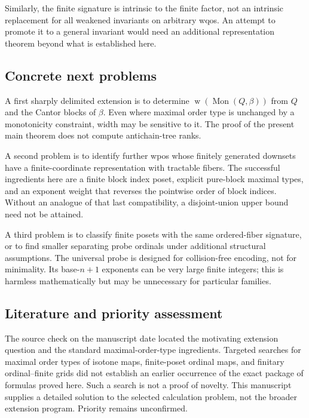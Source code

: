 \documentclass[11pt,a4paper]{article}
\theoremstyle{definition}
\theoremstyle{remark}
\newcommand{\Mon}{\operatorname{Mon}}
\newcommand{\width}{\operatorname{w}}
\begin{document}
Similarly, the finite signature is intrinsic to the finite factor, not an
intrinsic replacement for all weakened invariants on arbitrary wqos. An
attempt to promote it to a general invariant would need an additional
representation theorem beyond what is established here.

\subsection{Concrete next problems}
A first sharply delimited extension is to determine
$\width(\Mon(Q,\beta))$ from $Q$ and the Cantor blocks of $\beta$.
Even where maximal order type is unchanged by a monotonicity constraint,
width may be sensitive to it. The proof of the present main theorem does
not compute antichain-tree ranks.

A second problem is to identify further wpos whose finitely generated
downsets have a finite-coordinate representation with tractable fibers.
The successful ingredients here are a finite block index poset, explicit
pure-block maximal types, and an exponent weight that reverses the
pointwise order of block indices. Without an analogue of that last
compatibility, a disjoint-union upper bound need not be attained.

A third problem is to classify finite posets with the same ordered-fiber
signature, or to find smaller separating probe ordinals under additional
structural assumptions. The universal probe is designed for collision-free
encoding, not for minimality. Its base-$n+1$ exponents can be very large
finite integers; this is harmless mathematically but may be unnecessary
for particular families.

\subsection{Literature and priority assessment}
The source check on the manuscript date located the motivating extension
question and the standard maximal-order-type ingredients. Targeted searches
for maximal order types of isotone maps, finite-poset ordinal maps, and
finitary ordinal--finite grids did not establish an earlier occurrence of
the exact package of formulas proved here. Such a search is not a proof of
novelty. This manuscript supplies a detailed solution to the selected calculation
problem, not the broader extension program. Priority remains unconfirmed.

\appendix
\end{document}
